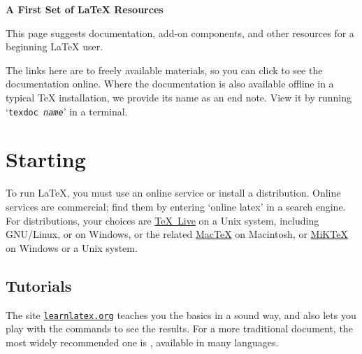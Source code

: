 \documentclass[11pt]{article}
\begin{document}
\thispagestyle{empty}
\begin{center}
  {\color{black}\LARGE\bf A First Set of \LaTeX{} Resources}  
\end{center}
\vspace{1.5ex}

\begin{multicols*}{2}

This page suggests documentation, add-on components, and other resources
for a beginning \LaTeX{} user.

The links here are to freely available materials,
so you can click to see the documentation online.
Where the documentation is also available
offline in a typical \TeX{} installation, we provide its name as an end note.
View it
by running `\texttt{texdoc {\it name}}' in a terminal.



\section{Starting}

To run \LaTeX{}, you must use an online service or 
install a distribution.
Online services are commercial; find them by entering `online latex' in
a search engine.
For distributions, your choices are
\href{https://tug.org/texlive/}{\TeX{}~Live} on
a Unix system, including GNU/Linux, or on Windows,
or the related 
\href{https://tug.org/mactex/}{Mac\TeX{}} on Macintosh,
or 
\href{https://miktex.org/}{MiK\TeX{}} on Windows or a Unix system.   

\subsection{Tutorials}
The site \href{https://www.learnlatex.org/}{\texttt{learnlatex.org}}
teaches you the basics in a sound way, and also
lets you play with the commands to see the results.
For a more traditional document, 
the most widely recommended one is 
\href{https://ctan.org/pkg/lshort-english}
 {}, available in many
 languages.


\end{multicols*}
\end{document}
